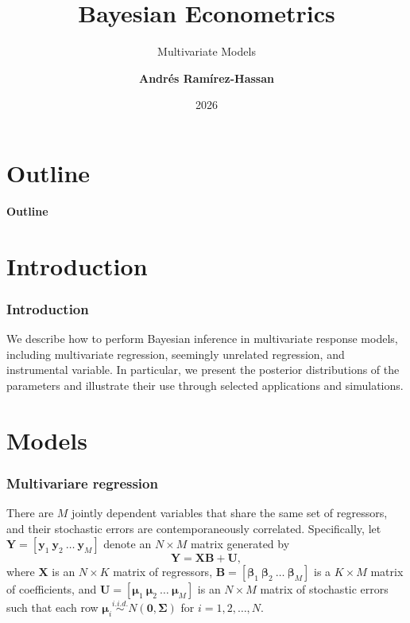 \documentclass[12pt, compress]{beamer}
\title{Bayesian Econometrics}
\subtitle{Multivariate Models}
\date{2026}
\author[Andr\'e Ram\'irez H.]{\textbf{Andr\'es Ram\'irez-Hassan}}
\institute[EAFIT]{\small{Universidad EAFIT\\School of Finance, Economics and Government}}
\begin{document}
	
	\maketitle
	
	
	
	
	\section*{Outline}
	\begin{frame}
		\textbf{\Large{Outline}}
		\tableofcontents
	\end{frame}
	
\section{Introduction}
	
\begin{frame}
	\frametitle{Introduction}
We describe how to perform Bayesian inference in multivariate response models, including multivariate regression, seemingly unrelated regression, and instrumental variable. In particular, we present the posterior distributions of the parameters and illustrate their use through selected applications and simulations.
\end{frame}

\section{Models}
\begin{frame}
	\frametitle{Multivariare regression}
There are $M$ jointly dependent variables that share the same set of regressors, and their stochastic errors are contemporaneously correlated. Specifically, let $\bm{Y} = \left[ \bm{y}_1 \ \bm{y}_2 \ \ldots \ \bm{y}_M \right]$ denote an $N \times M$ matrix generated by
\[
\bm{Y} = \bm{X}\bm{B} + \bm{U},
\]
where $\bm{X}$ is an $N \times K$ matrix of regressors, $\bm{B} = \left[ \bm{\beta}_1 \ \bm{\beta}_2 \ \ldots \ \bm{\beta}_M \right]$ is a $K \times M$ matrix of coefficients, and $\bm{U} = \left[ \bm{\mu}_1 \ \bm{\mu}_2 \ \ldots \ \bm{\mu}_M \right]$ is an $N \times M$ matrix of stochastic errors such that each row $\bm{\mu}_i \stackrel{i.i.d.}{\sim} N(\bm{0}, \bm{\Sigma})$ for $i = 1, 2, \dots, N$.
\end{frame}
\end{document}
